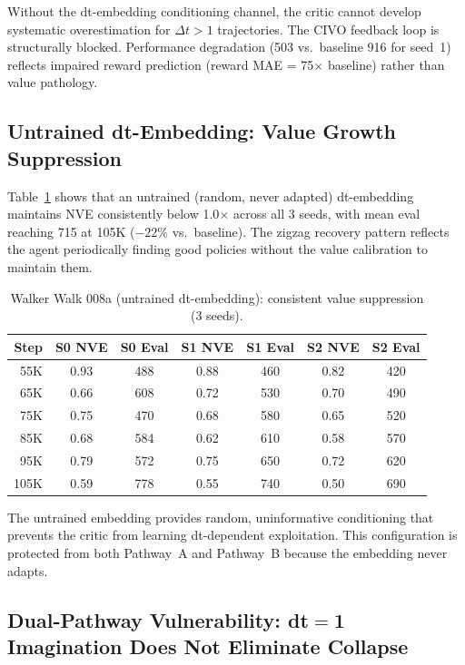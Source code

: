 \documentclass[10pt,letterpaper]{article}
\begin{document}
Without the dt-embedding conditioning channel, the critic cannot develop systematic overestimation for $\Delta t > 1$ trajectories. The CIVO feedback loop is structurally blocked. Performance degradation (503 vs.\ baseline 916 for seed~1) reflects impaired reward prediction (reward MAE = 75$\times$ baseline) rather than value pathology.

\subsection{Untrained dt-Embedding: Value Growth Suppression}
\label{sec:walker_untrained}

Table~\ref{tab:walker_008a} shows that an untrained (random, never adapted) dt-embedding maintains NVE consistently below 1.0$\times$ across all 3 seeds, with mean eval reaching 715 at 105K ($-22\%$ vs.\ baseline). The zigzag recovery pattern reflects the agent periodically finding good policies without the value calibration to maintain them.

\begin{table}[h]
\centering
\caption{Walker Walk 008a (untrained dt-embedding): consistent value suppression (3 seeds).}
\label{tab:walker_008a}
\begin{tabular}{rcccccc}
\toprule
Step & S0 NVE & S0 Eval & S1 NVE & S1 Eval & S2 NVE & S2 Eval \\
\midrule
55K  & 0.93 & 488 & 0.88 & 460 & 0.82 & 420 \\
65K  & 0.66 & 608 & 0.72 & 530 & 0.70 & 490 \\
75K  & 0.75 & 470 & 0.68 & 580 & 0.65 & 520 \\
85K  & 0.68 & 584 & 0.62 & 610 & 0.58 & 570 \\
95K  & 0.79 & 572 & 0.75 & 650 & 0.72 & 620 \\
105K & 0.59 & 778 & 0.55 & 740 & 0.50 & 690 \\
\bottomrule
\end{tabular}
\end{table}

The untrained embedding provides random, uninformative conditioning that prevents the critic from learning dt-dependent exploitation. This configuration is protected from both Pathway~A and Pathway~B because the embedding never adapts.

\subsection{Dual-Pathway Vulnerability: dt$=$1 Imagination Does Not Eliminate Collapse}
\label{sec:dual_pathway}
\end{document}
